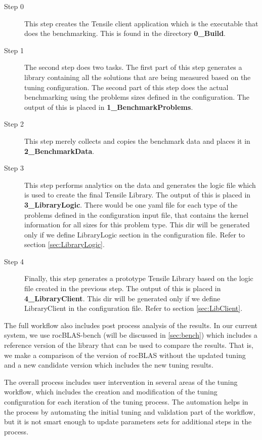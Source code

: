\documentclass[]{article}
\begin{document}
\begin{description}
	\item[Step 0] This step creates the Tensile client application which is the executable that does the benchmarking. This is found in the directory \textbf{0\_Build}.
	\item[Step 1] The second step does two tasks. The first part of this step generates a library containing all the solutions that are being measured based on the tuning configuration. The second part of this step does the actual benchmarking using the problems sizes defined in the configuration. The output of this is placed in \textbf{1\_BenchmarkProblems}.
	\item[Step 2] This step merely collects and copies the benchmark data and places it in \textbf{2\_BenchmarkData}.
	\item[Step 3] This step performs analytics on the data and generates the logic file which is used to create the final Tensile Library. The output of this is placed in \textbf{3\_LibraryLogic}. There would be one yaml file for each type of the problems defined in the configuration input file, that contains the kernel information for all sizes for this problem type. This dir will be generated only if we define LibraryLogic section in the configuration file. Refer to section \ref{sec:LibraryLogic}.
	\item[Step 4] Finally, this step generates a prototype Tensile Library based on the logic file created in the previous step. The output of this is placed in \textbf{4\_LibraryClient}. This dir will be generated only if we define LibraryClient in the configuration file. Refer to section \ref{sec:LibClient}.

\end{description}

The full workflow also includes post process analysis of the results. In our current system, we use rocBLAS-bench (will be discussed in \ref{sec:bench}) which includes a reference version of the library that can be used to compare the results. That is, we make a comparison of the version of rocBLAS without the updated tuning and a new candidate version which includes the new tuning results.

The overall process includes user intervention in several areas of the tuning workflow, which includes the creation and modification of the tuning configuration for each iteration of the tuning process. The automation helps in the process by automating the initial tuning and validation part of the workflow, but it is not smart enough to update parameters sets for additional steps in the process.
\end{document}
